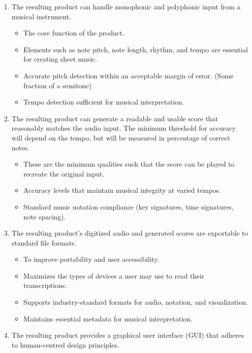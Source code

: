 \documentclass{article}
\begin{document}
\begin{enumerate}
    \item The resulting product can handle monophonic and polyphonic input from a 
    musical instrument.
    \begin{itemize}
        \item The core function of the product.
        \item Elements such as note pitch, note length, rhythm, and tempo are essential 
        for creating sheet music.
        \item Accurate pitch detection within an acceptable margin of error. (Some fraction of a semitone)
        \item Tempo detection sufficient for musical interpretation.
    \end{itemize}
    \item The resulting product can generate a readable and usable score that reasonably matches the 
    audio input. The minimum threshold for accuracy will depend on the tempo, but will be measured in percentage of correct notes.
        \begin{itemize}
            \item These are the minimum qualities such that the score can be played to recreate the 
            original input.
            \item Accuracy levels that maintain musical integrity at varied tempos.
            \item Standard music notation compliance (key signatures, time signatures, note spacing).
        \end{itemize}
    \item The resulting product's digitized audio and generated scores are exportable to standard file 
    formats.
    \begin{itemize}
        \item To improve portability and user accessibility.
        \item Maximizes the types of devices a user may use to read their transcriptions.
        \item Supports industry-standard formats for audio, notation, and visualization.
        \item Maintains essential metadata for musical interpretation.
    \end{itemize}
    \item The resulting product provides a graphical user interface (GUI) that adheres to 
    human-centred design principles.
    \begin{itemize}

\end{itemize}
\end{enumerate}
\end{document}
